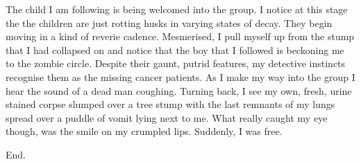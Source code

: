 The child I am following is being welcomed into the group. I
notice at this stage the the children are just rotting husks in
varying states of decay. They begin moving in a kind of reverie
cadence. Mesmerised, I pull myself up from the stump that I had
collapsed on and notice that the boy that I followed is beckoning
me to the zombie circle. Despite their gaunt, putrid features, my
detective instincts recognise them as the missing cancer patients.
As I make my way into the group I hear the sound of a dead man
coughing. Turning back, I see my own, fresh, urine stained corpse
slumped over a tree stump with the last remnants of my lungs spread
over a puddle of vomit lying next to me. What really caught my eye
though, was the smile on my crumpled lips. Suddenly, I was
free.



End. 
 



